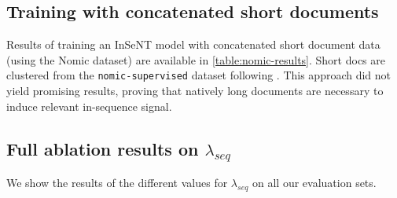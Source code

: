\subsection{Training with concatenated short documents}

Results of training an InSeNT model with concatenated short document data (using the Nomic dataset) are available in \autoref{table:nomic-results}. Short docs are clustered from the \texttt{nomic-supervised} dataset \cite{nussbaum2024nomic} following . This approach did not yield promising results, proving that natively long documents are necessary to induce relevant in-sequence signal.


\begin{table}[ht]
    \centering
    \renewcommand{\arraystretch}{1.2} %

    \caption[ConTEB evaluation results]{Evaluation (nDCG@10) of baseline models and our proposed method on \textit{ConTEB}. We show MB+InSeNT(Nomic) behaves like a non-contextual model after training on independent documents concatenated in a single sequence.}
    \label{table:nomic-results}
\end{table}

\subsection{Full ablation results on \texorpdfstring{$\lambda_{seq}$}{lambda-seq}}

We show the results of the different values for $\lambda_{seq}$ on all our evaluation sets.

